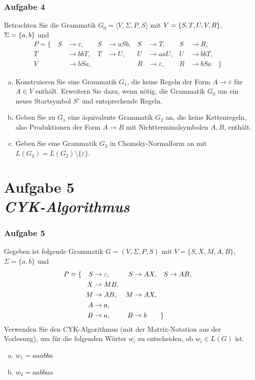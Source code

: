 \documentclass{beamer}
\newcommand{\tuple}[1]{\langle{#1}\rangle}
\begin{document}
	
	\begin{frame} \frametitle{Aufgabe 4}
		\small
		Betrachten Sie die Grammatik
		$G_0 = \tuple{V, \Sigma, P, S}$ mit $V = \left\{ S, T, U, V, R \right\}$, $\Sigma = \left\{ a,b \right\}$ und
		\begin{align*}
			P = \{ \quad 
			S &\to \varepsilon, & S &\to aSb, & S &\to T, & S &\to R, \\
			T &\to bbT, & T &\to U, & U &\to aaU, & U &\to bb T, \\
			V &\to bSa, &   &       & R &\to \varepsilon, & R &\to bSa \quad \}
		\end{align*}
		\vspace{-\baselineskip}
		\begin{enumerate}[a)]
			\item Konstruieren Sie eine Grammatik $G_1$, die
			keine Regeln der Form $A \to \varepsilon$ für $A\in V$ enthält.
			Erweitern Sie dazu, wenn nötig, die Grammatik $G_0$ um ein neues
			Startsymbol $S'$ und entsprechende Regeln.
			\item Geben Sie zu $G_1$ eine äquivalente Grammatik $G_2$ an, die
			keine Kettenregeln, also Produktionen der Form $A \to B$ mit
			Nichtterminalsymbolen $A,B$, enthält. 
			\item Geben Sie eine Grammatik $G_3$ in
			Chomsky-Normalform an mit $L(G_3) = L(G_2) \setminus \{\varepsilon\}$.
		\end{enumerate}
	\end{frame}

	\section{Aufgabe 5 \\ \itshape CYK-Algorithmus}
	
	\begin{frame} \frametitle{Aufgabe 5}
		\small
		Gegeben ist folgende Grammatik $G=(V,\Sigma,P,S)$ mit 
		$V=\{S,X,M,A,B\}$, $\Sigma=\{a,b\}$ und
		\begin{align*}
			P = \{ \quad S &\to \varepsilon, & S &\to AX, & S &\to AB, \\
			X &\to MB, \\
			M &\to AB, & M &\to AX, \\
			A &\to a, \\
			B &\to a, & B &\to b \rlap{\qquad \}} 
		\end{align*}
		Verwenden Sie den CYK-Algorithmus (mit der Matrix-Notation aus der
		Vorlesung), um für die folgenden Wörter $w_i$ zu entscheiden, ob
		$w_i\in L(G)$ ist. 
		
		\begin{enumerate}[a)]
			\item $w_1 = aaabba$
			\item $w_2 = aabbaa$
		\end{enumerate}    
	\end{frame}
\end{document}
